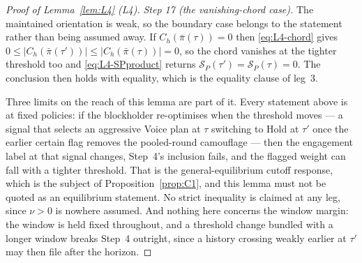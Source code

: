 \begin{proof}[Proof of Lemma~\ref{lem:L4} (L4)]
\emph{Step 17 (the vanishing-chord case).} The maintained orientation is weak, so the boundary case
belongs to the statement rather than being assumed away. If $C_h(\bar\pi(\tau)) = 0$ then
\eqref{eq:L4-chord} gives
$0 \le \lvert C_h(\bar\pi(\tau'))\rvert \le \lvert C_h(\bar\pi(\tau))\rvert = 0$, so the chord
vanishes at the tighter threshold too and \eqref{eq:L4-SPproduct} returns
$\mathcal S_P(\tau') = \mathcal S_P(\tau) = 0$. The conclusion then holds with equality, which is the
equality clause of leg~3.

Three limits on the reach of this lemma are part of it. Every statement above is at fixed policies:
if the blockholder re-optimises when the threshold moves --- a signal that selects an aggressive
Voice plan at $\tau$ switching to Hold at $\tau'$ once the earlier certain flag removes the
pooled-round camouflage --- then the engagement label at that signal changes, Step~4's inclusion
fails, and the flagged weight can fall with a tighter threshold. That is the general-equilibrium
cutoff response, which is the subject of Proposition~\ref{prop:C1}, and this lemma must not be quoted
as an equilibrium statement. No strict inequality is claimed at any leg, since $\nu > 0$ is nowhere
assumed. And nothing here concerns the window margin: the window is held fixed throughout, and a
threshold change bundled with a longer window breaks Step~4 outright, since a history crossing
weakly earlier at $\tau'$ may then file after the horizon.
\end{proof}

